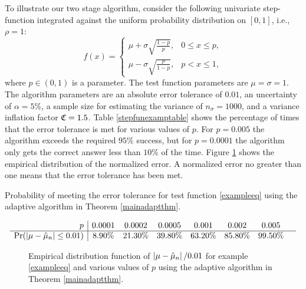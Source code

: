 \documentclass{article}
\begin{document}
To illustrate our two stage algorithm, consider the following univariate step-function integrated against the uniform probability distribution on $[0,1]$, i.e., $\rho=1$:
\begin{equation} \label{exampleeq}
f(x) = \begin{cases} \mu + \sigma \sqrt{\frac{1-p}{p}}, & 0 \le x \le p,\\
\mu - \sigma \sqrt{\frac{p}{1-p}}, & p < x \le 1,
\end{cases} %
\end{equation}
where $p \in (0,1)$ is a parameter.  
The test function parameters are $\mu=\sigma=1$.  The algorithm parameters are an absolute error tolerance of $0.01$, an uncertainty of $\alpha=5\%$, a sample size for estimating the variance of $n_\sigma=1000$, and a variance inflation factor $\mathfrak{C}=1.5$.  Table \ref{stepfunexamptable} shows the percentage of times that the error tolerance is met for various values of $p$.  For $p=0.005$ the algorithm exceeds the required $95\%$ success, but for $p=0.0001$ the algorithm only gets the correct answer less than $10\%$ of the time.  Figure \ref{normalerrfig} shows the empirical distribution of the normalized error.  A normalized error no greater than one means that the error tolerance has been met.  

\begin{table}
\caption{Probability of meeting the error tolerance for test function \eqref{exampleeq} using the adaptive algorithm in Theorem \ref{mainadaptthm}. \label{stepfunexamptable}}
\[
\begin{array}{r|ccccccccccc}
p &     0.0001 &   0.0002 &   0.0005 &    0.001 &    0.002 &    0.005 & \\ 
\hline
\Pr(\left|\mu-\hat{\mu}_n\right| \le 0.01)  &    8.90\% &    21.30\% &    39.80\% &    63.20\% &    85.80\% &    99.50\% & \\ 
\end{array}
\]
\end{table}

\begin{figure}
\centering
\caption{Empirical distribution function of $\left|\mu-\hat{\mu}_n\right|/0.01$ for example \eqref{exampleeq} and  various values of $p$ using the adaptive algorithm in Theorem \ref{mainadaptthm}. \label{normalerrfig}}
\end{figure}
\end{document}
